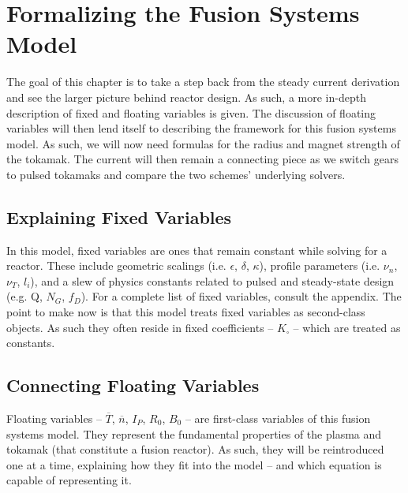%
%
%
%
%
%
%
%

\chapter{Formalizing the Fusion Systems Model}

The goal of this chapter is to take a step back from the steady current derivation and see the larger picture behind reactor design. As such, a more in-depth description of fixed and floating variables is given. The discussion of floating variables will then lend itself to describing the framework for this fusion systems model. As such, we will now need formulas for the radius and magnet strength of the tokamak. The current will then remain a connecting piece as we switch gears to pulsed tokamaks and compare the two schemes' underlying solvers.

\section{Explaining Fixed Variables} 

In this model, fixed variables are ones that remain constant while solving for a reactor. These include geometric scalings (i.e. $\epsilon$, $\delta$, $\kappa$), profile parameters (i.e. $\nu_n$, $\nu_T$, $l_i$), and a slew of physics constants related to pulsed and steady-state design (e.g. Q, $N_G$, $f_D$). For a complete list of fixed variables, consult the appendix. The point to make now is that this model treats fixed variables as second-class objects. As such they often reside in fixed coefficients -- $K_\square$ -- which are treated as constants.

\section{Connecting Floating Variables}

Floating variables -- $\overline T$, $\overline n$, $I_P$, $R_0$, $B_0$ -- are first-class variables of this fusion systems model. They represent the fundamental properties of the plasma and tokamak (that constitute a fusion reactor). As such, they will be reintroduced one at a time, explaining how they fit into the model -- and which equation is capable of representing it.

